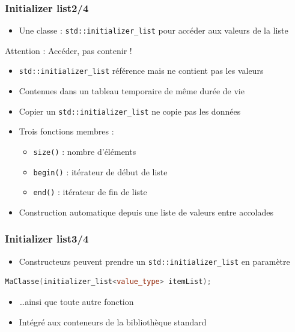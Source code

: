 \documentclass[C++.tex]{subfiles}
\begin{document}
\begin{frame}[fragile]
	\frametitle{Initializer list\titlehfill{}2/4}
	\begin{itemize}
		\item Une classe : \lstinline|std::initializer_list| pour accéder aux valeurs de la liste
	\end{itemize}

	\begin{alertblock}{Attention : Accéder, pas contenir !}
		\begin{itemize}
			\item \lstinline|std::initializer_list| référence mais ne contient pas les valeurs
			\item Contenues dans un tableau temporaire de même durée de vie
			\item Copier un \lstinline|std::initializer_list| ne copie pas les données
		\end{itemize}
	\end{alertblock}		

	\begin{itemize}
		\item Trois fonctions membres :
		\begin{itemize}
			\item \lstinline|size()| : nombre d'éléments
			\item \lstinline|begin()| : itérateur de début de liste
			\item \lstinline|end()| : itérateur de fin de liste
		\end{itemize}
		\item Construction automatique depuis une liste de valeurs entre accolades
	\end{itemize}
\end{frame}

\begin{frame}[fragile]
	\frametitle{Initializer list\titlehfill{}3/4}
	\begin{itemize}
		\item Constructeurs peuvent prendre un \lstinline|std::initializer_list| en paramètre
	\end{itemize}

	\begin{lstlisting}[language=C++]
MaClasse(initializer_list<value_type> itemList);\end{lstlisting}

	\begin{itemize}
		\item \ldots ainsi que toute autre fonction
		\item Intégré aux conteneurs de la bibliothèque standard
	\end{itemize}
\end{frame}
\end{document}

